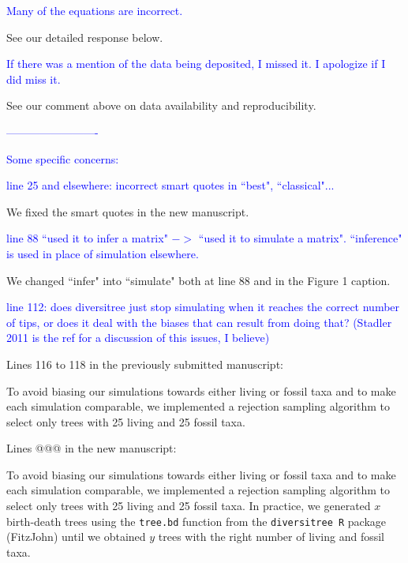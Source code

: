 \documentclass[11pt]{letter}
\begin{document}
\begin{letter}{}

\textcolor{blue}{Many of the equations are incorrect.}

See our detailed response below.

\textcolor{blue}{If there was a mention of the data being deposited, I missed it. I apologize if I did miss it.}

See our comment above on data availability and reproducibility.

\textcolor{blue}{-------------------------}

\textcolor{blue}{Some specific concerns:}


\textcolor{blue}{line 25 and elsewhere: incorrect smart quotes in ``best", ``classical"...}

We fixed the smart quotes in the new manuscript.

\textcolor{blue}{line 88 ``used it to infer a matrix" $->$ ``used it to simulate a matrix". ``inference" is used in place of simulation elsewhere.}

We changed ``infer" into ``simulate" both at line 88 and in the Figure 1 caption.

\textcolor{blue}{line 112: does diversitree just stop simulating when it reaches the correct number of tips, or does it deal with the biases that can result from doing that? (Stadler 2011 is the ref for a discussion of this issues, I believe)}

Lines 116 to 118 in the previously submitted manuscript:

\hfill\begin{minipage}{\dimexpr\textwidth-1cm}
To avoid biasing our simulations towards either living or fossil taxa and to make each simulation comparable, we implemented a rejection sampling algorithm to select only trees with 25 living and 25 fossil taxa.
\end{minipage}

Lines @@@ in the new manuscript:

\hfill\begin{minipage}{\dimexpr\textwidth-1cm}
To avoid biasing our simulations towards either living or fossil taxa and to make each simulation comparable, we implemented a rejection sampling algorithm to select only trees with 25 living and 25 fossil taxa. In practice, we generated $x$ birth-death trees using the \texttt{tree.bd} function from the \texttt{diversitree R} package (FitzJohn) until we obtained $y$ trees with the right number of living and fossil taxa.
\end{minipage}


\end{letter}
\end{document}
